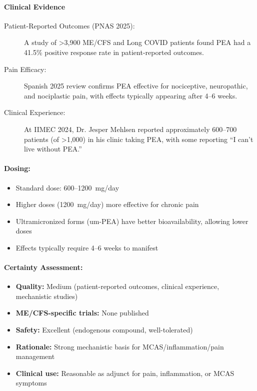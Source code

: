\paragraph{Clinical Evidence}

\begin{description}
    \item[Patient-Reported Outcomes (PNAS 2025):] A study of >3,900 ME/CFS and Long COVID patients found PEA had a 41.5\% positive response rate in patient-reported outcomes.
    \item[Pain Efficacy:] Spanish 2025 review confirms PEA effective for nociceptive, neuropathic, and nociplastic pain, with effects typically appearing after 4--6 weeks.
    \item[Clinical Experience:] At IIMEC 2024, Dr. Jesper Mehlsen reported approximately 600--700 patients (of >1,000) in his clinic taking PEA, with some reporting ``I can't live without PEA.''
\end{description}

\paragraph{Dosing:}
\begin{itemize}
    \item Standard dose: 600--1200~mg/day
    \item Higher doses (1200~mg/day) more effective for chronic pain
    \item Ultramicronized forms (um-PEA) have better bioavailability, allowing lower doses
    \item Effects typically require 4--6 weeks to manifest
\end{itemize}

\paragraph{Certainty Assessment:}
\begin{itemize}
    \item \textbf{Quality:} Medium (patient-reported outcomes, clinical experience, mechanistic studies)
    \item \textbf{ME/CFS-specific trials:} None published
    \item \textbf{Safety:} Excellent (endogenous compound, well-tolerated)
    \item \textbf{Rationale:} Strong mechanistic basis for MCAS/inflammation/pain management
    \item \textbf{Clinical use:} Reasonable as adjunct for pain, inflammation, or MCAS symptoms
\end{itemize}

